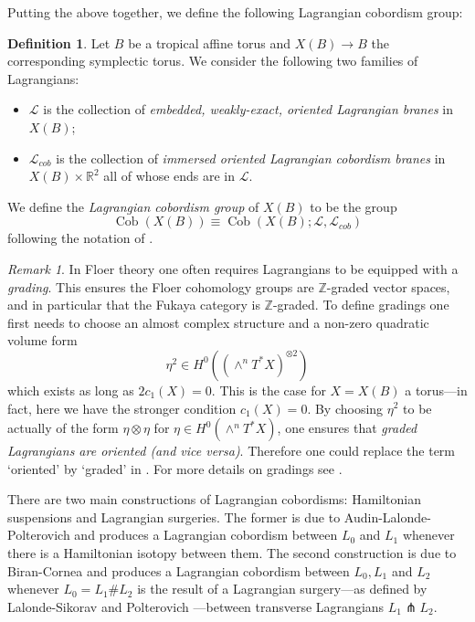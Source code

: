 \documentclass[10pt]{amsart}
\theoremstyle{definition}
\newtheorem{defn}[thm]{Definition}
\theoremstyle{remark}
\newtheorem{remark}[thm]{Remark}
\def\R{\mathbb{R}}
\def\Z{\mathbb{Z}}
\DeclareMathOperator{\Cob}{Cob}
\newcommand{\mcal}{\mathcal}
\def\x{\times}
\begin{document}
Putting the above together, we define the following Lagrangian cobordism group:
\begin{defn}\label{defn:lagcobgroup_thispaper}
    Let $B$ be a tropical affine torus and $X(B) \to B$ the corresponding symplectic torus.
    We consider the following two families of Lagrangians:
    \begin{itemize}
        \item $\mcal L$ is the collection of \emph{embedded, weakly-exact, oriented Lagrangian branes} in $X(B)$;
        \item $\mcal L_{cob}$ is the collection of \emph{immersed oriented Lagrangian cobordism branes} in $X(B) \x \R^2$ all of whose ends are in $\mcal L$.
    \end{itemize}
    We define the \emph{Lagrangian cobordism group} of $X(B)$ to be the group
    $$
        \Cob(X(B)) \equiv \Cob(X(B);\mcal L,\mcal L_{cob}) 
    $$
    following the notation of .
\end{defn}

\begin{remark}
    In Floer theory one often requires Lagrangians to be equipped with a \emph{grading}.
    This ensures the Floer cohomology groups are $\Z$-graded vector spaces, and in particular that the Fukaya category is $\Z$-graded.
    To define gradings one first needs to choose an almost complex structure and a non-zero quadratic volume form 
    $$
    \eta^2 \in H^0((\wedge^n T^*X)^{\otimes 2})
    $$
    which exists as long as $2c_1(X) = 0$.
    This is the case for $X = X(B)$ a torus---in fact, here we have the stronger condition $c_1(X) = 0$.
    By choosing $\eta^2$ to be actually of the form $\eta \otimes \eta$ for $\eta\in H^0(\wedge^n T^*X)$, one ensures that \emph{graded Lagrangians are oriented (and vice versa)}.
    Therefore one could replace the term `oriented' by `graded' in .
    For more details on gradings see \cite{seidel2008fukaya}.
\end{remark}

There are two main constructions of Lagrangian cobordisms: Hamiltonian suspensions and Lagrangian surgeries.
The former is due to Audin-Lalonde-Polterovich \cite{audin1994symplectic} and produces a Lagrangian cobordism between $L_0$ and $L_1$ whenever there is a Hamiltonian isotopy between them.
The second construction is due to Biran-Cornea \cite{biran2013lagrangian} and produces a Lagrangian cobordism between $L_0, L_1$ and $L_2$ whenever $L_0 = L_1\# L_2$ is the result of a Lagrangian surgery---as defined by Lalonde-Sikorav \cite{lalonde1991sous} and Polterovich \cite{polterovich1991surgery}---between transverse Lagrangians $L_1\pitchfork L_2$.
\end{document}
